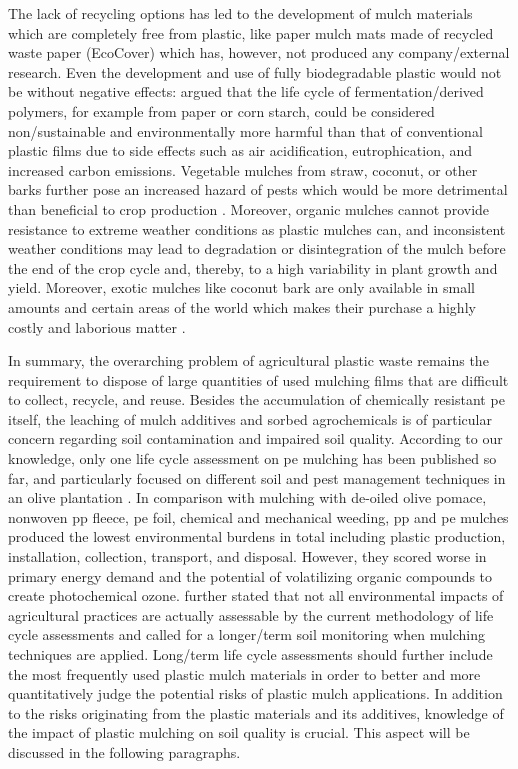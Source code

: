 The lack of recycling options has led to the development of mulch materials which are completely free from plastic, like paper mulch mats made of recycled waste paper (EcoCover) which has, however, not produced any company\-/external research. Even the development and use of fully biodegradable plastic would not be without negative effects: \citet{GerngrossCan1999} argued that the life cycle of fermentation\-/derived polymers, for example from paper or corn starch, could be considered non\-/sustainable and environmentally more harmful than that of conventional plastic films due to side effects such as air acidification, eutrophication, and increased carbon emissions. Vegetable mulches from straw, coconut, or other barks further pose an increased hazard of pests which would be more detrimental than beneficial to crop production \citep{HowardOrganic1998}. Moreover, organic mulches cannot provide resistance to extreme weather conditions as plastic mulches can, and inconsistent weather conditions may lead to degradation or disintegration of the mulch before the end of the crop cycle and, thereby, to a high variability in plant growth and yield. Moreover, exotic mulches like coconut bark are only available in small amounts and certain areas of the world which makes their purchase a highly costly and laborious matter \citep{BriassoulisDegradation2015}.

In summary, the overarching problem of agricultural plastic waste remains the requirement to dispose of large quantities of used mulching films that are difficult to collect, recycle, and reuse. Besides the accumulation of chemically resistant \ac{pe} itself, the leaching of mulch additives and sorbed agrochemicals is of particular concern regarding soil contamination and impaired soil quality. According to our knowledge, only one life cycle assessment on \ac{pe} mulching has been published so far, and particularly focused on different soil and pest management techniques in an olive plantation \citep{RussoEnvironmental2015}.
In comparison with mulching with de-oiled olive pomace, nonwoven \ac{pp} fleece, \ac{pe} foil, chemical and mechanical weeding, \ac{pp} and \ac{pe} mulches produced the lowest environmental burdens in total including plastic production, installation, collection, transport, and disposal. However, they scored worse in primary energy demand and the potential of volatilizing organic compounds to create photochemical ozone. \citet{RussoEnvironmental2015} further stated that not all environmental impacts of agricultural practices are actually assessable by the current methodology of life cycle assessments and called for a longer\-/term soil monitoring when mulching techniques are applied. Long\-/term life cycle assessments should further include the most frequently used plastic mulch materials in order to better and more quantitatively judge the potential risks of plastic mulch applications. In addition to the risks originating from the plastic materials and its additives, knowledge of the impact of plastic mulching on soil quality is crucial. This aspect will be discussed in the following paragraphs.

